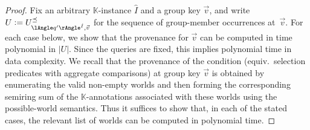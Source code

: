 \begin{proof}
Fix an arbitrary $\mathbb K$-instance $\hat I$ and a group key $\vec v$, and write $U\defeq U^{\preceq}_{\angsem{\hat I}{q'},\vec v}$ for the sequence of group-member occurrences at~$\vec v$.
For each case below, we show that the provenance for $\vec v$ can be computed in time polynomial in $|U|$. Since the queries are fixed, this implies polynomial time in data complexity.
We recall that the provenance of the  condition (equiv.\ selection predicates with aggregate comparisons) at group key $\vec v$ is obtained by enumerating the valid non-empty worlds
and then forming the corresponding semiring sum of the $\mathbb K$-annotations associated with these worlds using the possible-world semantics. Thus it suffices to show that, in each of the stated cases, the relevant list of worlds can be computed in polynomial time.


\end{proof}
